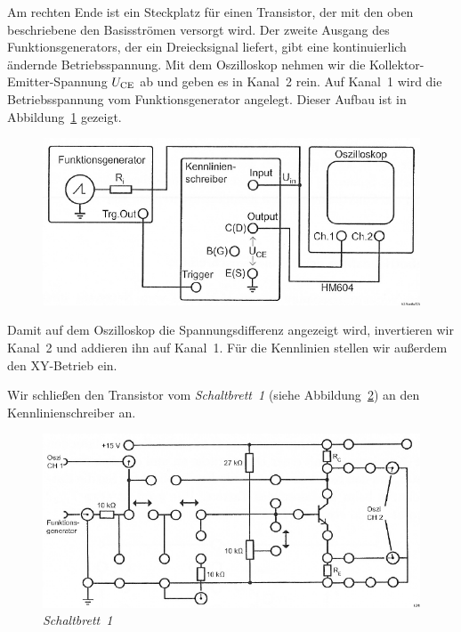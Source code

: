 Am rechten Ende ist ein Steckplatz für einen Transistor, der mit den oben
beschriebene den Basisströmen versorgt wird. Der zweite Ausgang des
Funktionsgenerators, der ein Dreiecksignal liefert, gibt eine kontinuierlich
ändernde Betriebsspannung. Mit dem Oszilloskop nehmen wir die
Kollektor-Emitter-Spannung $U_\text{CE}$ ab und geben es in Kanal~2 rein. Auf Kanal~1
wird die Betriebsspannung vom Funktionsgenerator angelegt. Dieser Aufbau ist in
Abbildung~\ref{fig:3-2} gezeigt.

\begin{figure}[htbp]
	\centering
	\includegraphics[width=\textwidth]{Anleitung/3-2.png}
	\caption{
		\cite[Abbildung~3.2]{physik313-Anleitung}
	}
	\label{fig:3-2}
\end{figure}

Damit auf dem Oszilloskop die Spannungsdifferenz angezeigt wird, invertieren
wir Kanal~2 und addieren ihn auf Kanal~1. Für die Kennlinien stellen wir
außerdem den XY-Betrieb ein.

Wir schließen den Transistor vom \emph{Schaltbrett~1} (siehe
Abbildung~\ref{fig:3-4}) an den Kennlinienschreiber an.

\begin{figure}[htbp]
	\centering
	\includegraphics[width=\textwidth]{Anleitung/3-4.png}
	\caption{
		\emph{Schaltbrett~1} \cite[Abbildung~3.4]{physik313-Anleitung}
	}
	\label{fig:3-4}
\end{figure}

